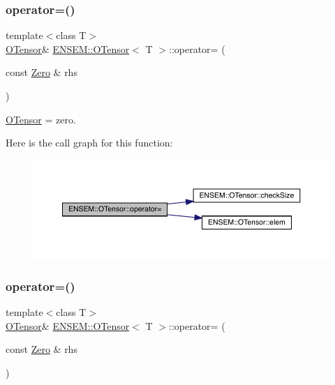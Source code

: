 \subsubsection{\texorpdfstring{operator=()}{operator=()}\hspace{0.1cm}{\footnotesize\ttfamily [2/12]}}
{\footnotesize\ttfamily template$<$class T$>$ \\
\mbox{\hyperlink{classENSEM_1_1OTensor}{O\+Tensor}}\& \mbox{\hyperlink{classENSEM_1_1OTensor}{E\+N\+S\+E\+M\+::\+O\+Tensor}}$<$ T $>$\+::operator= (\begin{DoxyParamCaption}\item[{const \mbox{\hyperlink{structENSEM_1_1Zero}{Zero}} \&}]{rhs }\end{DoxyParamCaption})\hspace{0.3cm}{\ttfamily [inline]}}



\mbox{\hyperlink{classENSEM_1_1OTensor}{O\+Tensor}} = zero. 

Here is the call graph for this function\+:
\nopagebreak
\begin{figure}[H]
\begin{center}
\leavevmode
\includegraphics[width=350pt]{da/d8a/classENSEM_1_1OTensor_aae562552ce915d3d39c65dfe463fa50a_cgraph}
\end{center}
\end{figure}
\mbox{\label{classENSEM_1_1OTensor_aae562552ce915d3d39c65dfe463fa50a}} 
\subsubsection{\texorpdfstring{operator=()}{operator=()}\hspace{0.1cm}{\footnotesize\ttfamily [3/12]}}
{\footnotesize\ttfamily template$<$class T$>$ \\
\mbox{\hyperlink{classENSEM_1_1OTensor}{O\+Tensor}}\& \mbox{\hyperlink{classENSEM_1_1OTensor}{E\+N\+S\+E\+M\+::\+O\+Tensor}}$<$ T $>$\+::operator= (\begin{DoxyParamCaption}\item[{const \mbox{\hyperlink{structENSEM_1_1Zero}{Zero}} \&}]{rhs }\end{DoxyParamCaption})\hspace{0.3cm}{\ttfamily [inline]}}



